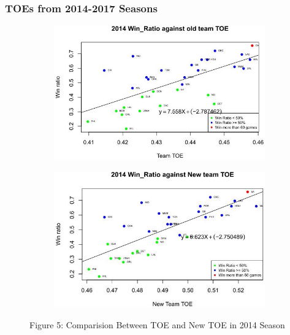\documentclass[11pt]{article}
\begin{document}
\subsubsection*{TOEs from 2014-2017 Seasons}
\begin{figure}[h!]
  \centering
  \begin{subfigure}[b]{0.45\linewidth}
    \includegraphics[width=\linewidth]{14old.jpg}
  \end{subfigure}
  \begin{subfigure}[b]{0.45\linewidth}
    \includegraphics[width=\linewidth]{14new.jpg}
  \end{subfigure}
\bigskip

Figure 5: Comparision Between TOE and New TOE in 2014 Season

\end{figure}
\end{document}
